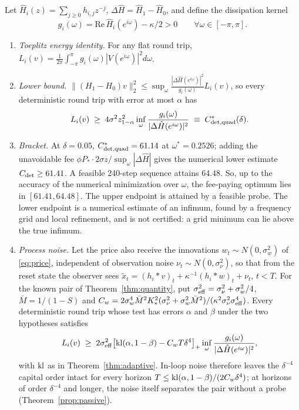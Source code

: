 \begin{theorem}\label{thm:spectral}
Let $\hat H_i(z)=\sum_{j\ge0}h_{i,j}z^{-j}$, $\Delta\hat H=\hat H_1-\hat H_0$, and define the dissipation kernel
\begin{equation}\label{eq:gdiss}
g_i(\omega)=\mathrm{Re}\,\hat H_i(e^{i\omega})-\kappa/2>0\qquad\forall\omega\in[-\pi,\pi].
\end{equation}
\begin{enumerate}[label=(\roman*)]
\item \emph{Toeplitz energy identity.} For any flat round trip, $L_i(v)=\frac1{2\pi}\int_{-\pi}^{\pi}g_i(\omega)|V(e^{i\omega})|^2d\omega$.
\item \emph{Lower bound.} $\|(H_1-H_0)v\|_2^2\le\sup_\omega\frac{|\Delta\hat H(e^{i\omega})|^2}{g_i(\omega)}L_i(v)$, so every deterministic round trip with error at most $\alpha$ has
\begin{equation}\label{eq:Cdet}
L_i(v)\;\ge\;4\sigma^2z_{1-\alpha}^2\inf_\omega\frac{g_i(\omega)}{|\Delta\hat H(e^{i\omega})|^2}\;\equiv\;C^*_{\rm det,quad}(\delta).
\end{equation}
\item \emph{Bracket.} At $\delta=0.05$, $C^*_{\rm det,quad}=61.14$ at $\omega^*=0.2526$; adding the unavoidable fee $\phi P_*\cdot2\sigma z/\sup_\omega|\Delta\hat H|$ gives the numerical lower estimate $C_{\rm det}\ge61.41$. A feasible 240-step sequence attains 64.48. So, up to the accuracy of the numerical minimization over $\omega$, the fee-paying optimum lies in $[61.41,64.48]$. The upper endpoint is attained by a feasible probe. The lower endpoint is a numerical estimate of an infimum, found by a frequency grid and local refinement, and is not certified: a grid minimum can lie above the true infimum.
\item \emph{Process noise.} Let the price also receive the innovations $w_t\sim N(0,\sigma_w^2)$ of \eqref{eq:price}, independent of observation noise $\nu_t\sim N(0,\sigma_\nu^2)$, so that from the reset state the observer sees $\tilde x_t=(h_i*v)_t+\kappa^{-1}(h_i*w)_t+\nu_t$, $t<T$. For the known pair of Theorem~\ref{thm:quantity}, put $\sigma_{\rm eff}^2=\sigma_\nu^2+\sigma_w^2/4$, $\bar M=1/(1-S)$ and $C_w=2\sigma_w^4\bar M^2K_*^2(\sigma_\nu^2+\sigma_w^2\bar M^2)/(\kappa^2\sigma_\nu^2\sigma_{\rm eff}^4)$. Every deterministic round trip whose test has errors $\alpha$ and $\beta$ under the two hypotheses satisfies
\begin{equation}\label{eq:Cnoise}
L_i(v)\;\ge\;2\sigma_{\rm eff}^2\bigl[{\rm kl}(\alpha,1-\beta)-C_wT\delta^4\bigr]_+\inf_\omega\frac{g_i(\omega)}{|\Delta\hat H(e^{i\omega})|^2},
\end{equation}
with ${\rm kl}$ as in Theorem~\ref{thm:adaptive}. In-loop noise therefore leaves the $\delta^{-4}$ capital order intact for every horizon $T\le{\rm kl}(\alpha,1-\beta)/(2C_w\delta^4)$; at horizons of order $\delta^{-4}$ and longer, the noise itself separates the pair without a probe (Theorem~\ref{prop:passive}).
\end{enumerate}
\end{theorem}

